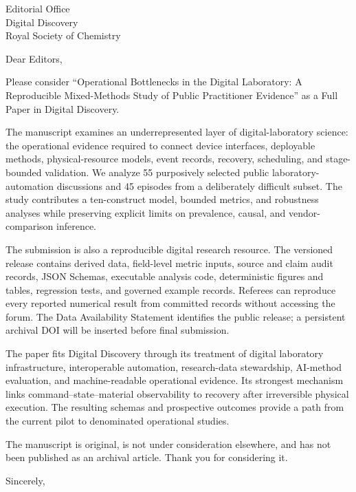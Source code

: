 \documentclass[10pt]{letter}
\begin{document}
\begin{letter}{Editorial Office\\Digital Discovery\\Royal Society of Chemistry}
\opening{Dear Editors,}

Please consider ``Operational Bottlenecks in the Digital Laboratory: A Reproducible Mixed-Methods Study of Public Practitioner Evidence'' as a Full Paper in Digital Discovery.

The manuscript examines an underrepresented layer of digital-laboratory science: the operational evidence required to connect device interfaces, deployable methods, physical-resource models, event records, recovery, scheduling, and stage-bounded validation. We analyze 55 purposively selected public laboratory-automation discussions and 45 episodes from a deliberately difficult subset. The study contributes a ten-construct model, bounded metrics, and robustness analyses while preserving explicit limits on prevalence, causal, and vendor-comparison inference.

The submission is also a reproducible digital research resource. The versioned release contains derived data, field-level metric inputs, source and claim audit records, JSON Schemas, executable analysis code, deterministic figures and tables, regression tests, and governed example records. Referees can reproduce every reported numerical result from committed records without accessing the forum. The Data Availability Statement identifies the public release; a persistent archival DOI will be inserted before final submission.

The paper fits Digital Discovery through its treatment of digital laboratory infrastructure, interoperable automation, research-data stewardship, AI-method evaluation, and machine-readable operational evidence. Its strongest mechanism links command--state--material observability to recovery after irreversible physical execution. The resulting schemas and prospective outcomes provide a path from the current pilot to denominated operational studies.

The manuscript is original, is not under consideration elsewhere, and has not been published as an archival article. Thank you for considering it.

\closing{Sincerely,}
\end{letter}
\end{document}
